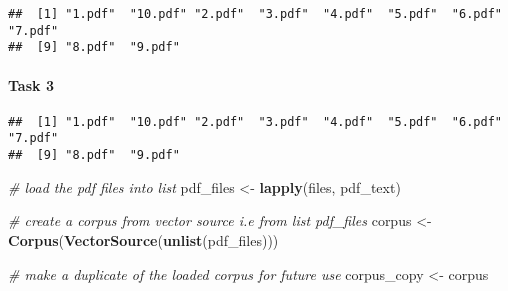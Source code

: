 \documentclass[
]{article}
\newenvironment{Shaded}{\begin{snugshade}}{\end{snugshade}}
\newcommand{\AttributeTok}[1]{\textcolor[rgb]{0.13,0.29,0.53}{#1}}
\newcommand{\CommentTok}[1]{\textcolor[rgb]{0.56,0.35,0.01}{\textit{#1}}}
\newcommand{\FunctionTok}[1]{\textcolor[rgb]{0.13,0.29,0.53}{\textbf{#1}}}
\newcommand{\NormalTok}[1]{#1}
\newcommand{\OtherTok}[1]{\textcolor[rgb]{0.56,0.35,0.01}{#1}}
\newcommand{\StringTok}[1]{\textcolor[rgb]{0.31,0.60,0.02}{#1}}
\begin{document}
\begin{Shaded}
\end{Shaded}

\begin{verbatim}
##  [1] "1.pdf"  "10.pdf" "2.pdf"  "3.pdf"  "4.pdf"  "5.pdf"  "6.pdf"  "7.pdf" 
##  [9] "8.pdf"  "9.pdf"
\end{verbatim}

\hypertarget{task-3}{%
\paragraph{\texorpdfstring{\textbf{Task 3}}{Task 3}}\label{task-3}}

\begin{Shaded}
\end{Shaded}

\begin{verbatim}
##  [1] "1.pdf"  "10.pdf" "2.pdf"  "3.pdf"  "4.pdf"  "5.pdf"  "6.pdf"  "7.pdf" 
##  [9] "8.pdf"  "9.pdf"
\end{verbatim}

\begin{Shaded}
\begin{Highlighting}[]
\CommentTok{\# load the pdf files into list}
\NormalTok{pdf\_files }\OtherTok{\textless{}{-}} \FunctionTok{lapply}\NormalTok{(files, pdf\_text)}
\end{Highlighting}
\end{Shaded}

\begin{Shaded}
\begin{Highlighting}[]
\CommentTok{\# create a corpus from vector source i.e from list pdf\_files}
\NormalTok{corpus }\OtherTok{\textless{}{-}} \FunctionTok{Corpus}\NormalTok{(}\FunctionTok{VectorSource}\NormalTok{(}\FunctionTok{unlist}\NormalTok{(pdf\_files)))}

\CommentTok{\# make a duplicate of the loaded corpus for future use}
\NormalTok{corpus\_copy }\OtherTok{\textless{}{-}}\NormalTok{ corpus}
\end{Highlighting}
\end{Shaded}
\end{document}
